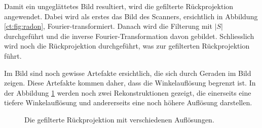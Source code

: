 Damit ein ungeglättetes Bild resultiert, wird die gefilterte Rückprojektion angewendet. Dabei wird als erstes das Bild des Scanners, ersichtlich in Abbildung \ref{ct:fig:radon}, Fourier-transformiert. Danach wird die Filterung mit $|S|$ durchgeführt und die inverse Fourier-Transformation davon gebildet. Schliesslich wird noch die Rückprojektion durchgeführt, was zur gefilterten Rückprojektion führt. 

Im Bild sind noch gewisse Artefakte ersichtlich, die sich durch Geraden im Bild zeigen. Diese Artefakte kommen daher, dass die Winkelauflösung begrenzt ist. In der Abbildung \ref{ct:fig:res} werden noch zwei Rekonstruktionen gezeigt, die einerseits eine tiefere Winkelauflösung und andererseits eine noch höhere Auflösung darstellen.

\begin{figure}
	\centering
	\caption{Die gefilterte Rückprojektion mit verschiedenen Auflösungen.}
	\label{ct:fig:res}
\end{figure}










